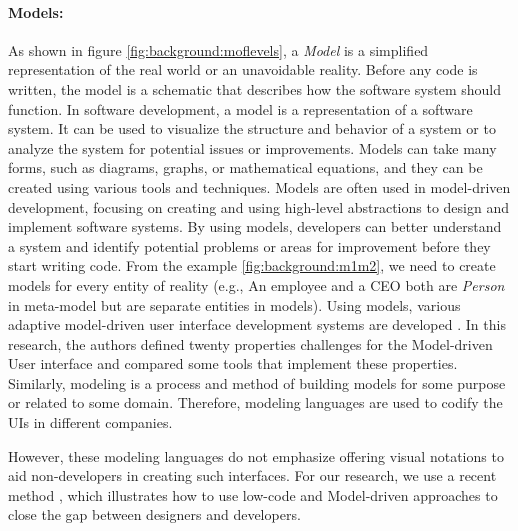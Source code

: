 \paragraph{Models: } 
As shown in figure \ref{fig:background:moflevels}, a \textit{Model} is a simplified representation of the real world or an unavoidable reality.
Before any code is written, the model is a schematic that describes how the software system should function.
In software development, a model is a representation of a software system. 
It can be used to visualize the structure and behavior of a system or to analyze the system for potential issues or improvements. 
Models can take many forms, such as diagrams, graphs, or mathematical equations, and they can be created using various tools and techniques. 
Models are often used in model-driven development, focusing on creating and using high-level abstractions to design and implement software systems. 
By using models, developers can better understand a system and identify potential problems or areas for improvement before they start writing code.
From the example \ref{fig:background:m1m2}, we need to create models for every entity of reality (e.g., An employee and a CEO both are \textit{Person} in meta-model but are separate entities in models).
Using models, various adaptive model-driven user interface development systems are developed \cite{article:mbse:akiki}.
In this research, the authors defined twenty properties challenges for the Model-driven User interface and compared some tools that implement these properties.
Similarly, modeling is a process and method of building models for some purpose or related to some domain.
Therefore, modeling languages are used to codify the UIs in different companies. 

However, these modeling languages do not emphasize offering visual notations to aid non-developers in creating such interfaces. 
For our research, we use a recent method \cite{article:mbse:bexiga}, which illustrates how to use low-code and Model-driven approaches to close the gap between designers and developers.

\clearpage
